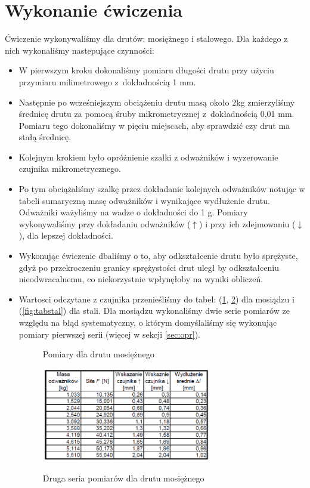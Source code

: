 \documentclass [a4paper,11pt]{article}
\begin{document}
	\section{Wykonanie ćwiczenia}
	Ćwiczenie wykonywaliśmy dla drutów: mosiężnego i stalowego. Dla każdego z nich wykonaliśmy nastepujące czynności:
	\begin{itemize}
		\item W pierwszym kroku dokonaliśmy pomiaru długości drutu przy użyciu przymiaru milimetrowego z~dokładnością 1 mm.
		
		\item Następnie po wcześniejszym obciążeniu drutu masą około 2kg zmierzyliśmy średnicę drutu za pomocą śruby mikrometrycznej z~dokładnością 0,01 mm. Pomiaru tego dokonaliśmy w pięciu miejscach, aby sprawdzić czy drut ma stałą średnicę.
		
		\item Kolejnym krokiem było opróżnienie szalki z odważników i wyzerowanie czujnika mikrometrycznego.
		
		\item Po tym obciążaliśmy szalkę przez dokładanie kolejnych odważników notując w tabeli sumaryczną masę odważników i wynikające wydłużenie drutu. Odważniki ważyliśmy na wadze o dokładności do 1 g. Pomiary wykonywaliśmy przy dokładaniu odważników ($\uparrow $) i przy ich zdejmowaniu ($\downarrow $), dla lepszej dokładności.
		
		\item Wykonując ćwiczenie dbaliśmy o to, aby odkształcenie drutu było sprężyste, gdyż po przekroczeniu granicy sprężystości drut uległ by odkształceniu nieodwracalnemu, co niekorzystnie wpłynęłoby na wyniki obliczeń.
		
		\item Wartosci odczytane z czujnika przenieśliśmy do tabel: (\ref{fig:tebmosiadz}, \ref{fig:tebmosiadz2}) dla mosiądzu i (\ref{fig:tabstal}) dla stali. Dla mosiądzu wykonaliśmy dwie serie pomiarów ze względu na błąd systematyczny, o którym domyślaliśmy się wykonując pomiary pierwszej serii (więcej w sekcji \ref{sec:opr}).
	
	\begin{figure}[!h]
		\centering
		\caption{Pomiary dla drutu mosiężnego}
		\label{fig:tebmosiadz}
	\end{figure}
	
	\begin{figure}[!h]
		\centering
		\caption{Druga seria pomiarów dla drutu mosiężnego}
		\includegraphics[width=0.7\textwidth]{tabmosiadz2}
		\label{fig:tebmosiadz2}
	\end{figure}
	

\end{itemize}
\end{document}
